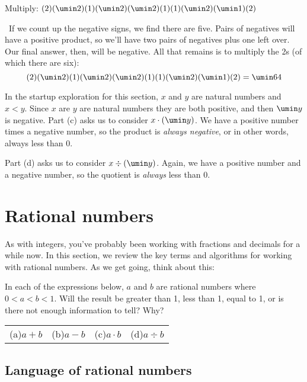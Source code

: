 \begin{boxex}
Multiply: $(2)(\umin2)(1)(\umin2)(\umin2)(1)(1)(\umin2)(\umin1)(2)$

\exsoln\ If we count up the negative signs, we find there are five. Pairs of negatives will have a positive product, so we'll have two pairs of negatives plus one left over. Our final answer, then, will be negative. All that remains is to multiply the 2s (of which there are six): \[(2)(\umin2)(1)(\umin2)(\umin2)(1)(1)(\umin2)(\umin1)(2) = \umin64\]
\end{boxex}

In the startup exploration for this section, $x$ and $y$ are natural numbers and $x<y$. Since $x$ are $y$ are natural numbers they are both positive, and then $\umin y$ is negative. Part (c) asks us to consider $x\cdot(\umin y)$. We have a positive number times a negative number, so the product is \textit{always negative}, or in other words, always less than 0.

Part (d) asks us to consider $x\div(\umin y)$. Again, we have a positive number and a negative number, so the quotient is \textit{always} less than 0.


\section{Rational numbers}
\label{sec:rationals}

As with integers, you've probably been working with fractions and decimals for a while now. In this section, we review the key terms and algorithms for working with rational numbers. As we get going, think about this:

\begin{boxexplore}
In each of the expressions below, $a$ and $b$ are rational numbers where $0 < a < b < 1$. Will the result be greater than 1, less than 1, equal to 1, or is there not enough information to tell? Why?

\begin{tabularx}{\textwidth}{YYYY}
(a)\quad $a+b$
&
(b)\quad $a-b$
&
(c)\quad $a \cdot b$
&
(d)\quad $a \div b$
\end{tabularx}
\end{boxexplore}

\subsection{Language of rational numbers}

